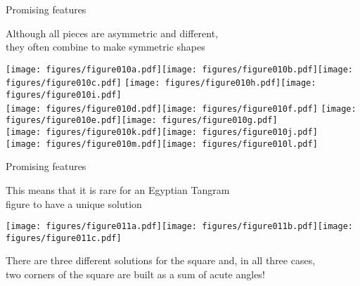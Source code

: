 \documentclass[14pt]{beamer}
\begin{document}

    \begin{frame}{Promising features}
        \begin{center}
            Although all pieces are asymmetric and different,\\they often combine to make symmetric shapes

            \bigskip \bigskip

            \texttt{[image: figures/figure010a.pdf]}\quad\texttt{[image: figures/figure010b.pdf]}\quad\texttt{[image: figures/figure010c.pdf]}\qquad
            \texttt{[image: figures/figure010h.pdf]}\quad\texttt{[image: figures/figure010i.pdf]} \\ \bigskip
            \texttt{[image: figures/figure010d.pdf]}\quad\texttt{[image: figures/figure010f.pdf]} \quad
            \texttt{[image: figures/figure010e.pdf]}\quad\texttt{[image: figures/figure010g.pdf]} \\ \bigskip
            \texttt{[image: figures/figure010k.pdf]}\quad\texttt{[image: figures/figure010j.pdf]} \\ \medskip
            \texttt{[image: figures/figure010m.pdf]}\quad\texttt{[image: figures/figure010l.pdf]} \\
        \end{center}
    \end{frame}


    \begin{frame}{Promising features}
        \begin{center}
            This means that it is rare for an Egyptian Tangram\\ figure to have a unique solution

            \bigskip \bigskip

            \texttt{[image: figures/figure011a.pdf]}\quad\texttt{[image: figures/figure011b.pdf]}\quad\texttt{[image: figures/figure011c.pdf]} \\

            \vspace{2em}

            {\footnotesize There are three different solutions for the square and, in all three cases,\\two corners of the square are built as a sum of acute angles!}
        \end{center}
    \end{frame}
\end{document}
